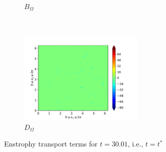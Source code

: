 \begin{figure}[H]
\begin{subfigure}{0.45\textwidth}
        \caption{$B_{\Omega}$}
    \end{subfigure}
    ~
    \begin{subfigure}{0.45\textwidth}
        \includegraphics[height=1.75in]{media/run-cds-65/D-enst-1340}
        \caption{$D_{\Omega}$}
    \end{subfigure}
    \caption{Enstrophy transport terms for $t=30.01$, i.e., $t=t^{\ast} $}
\end{figure}

\newpage

